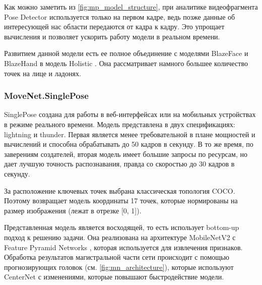 Как можно заметить из \autoref{fig:mp_model_structure}, при аналитике видеофрагмента Pose Detector используется только на первом кадре, ведь позже данные об интересующей нас области передаются от кадра к кадру. Это упрощает вычисления и позволяет ускорить работу модели в реальном времени.

Развитием данной модели есть ее полное объединение с моделями BlazeFace и BlazeHand в модель Holistic \cite{Holistic}. Она рассматривает намного большее количество точек на лице и ладонях.



\subsubsection{MoveNet.SinglePose}

SinglePose создана для работы в веб-интерфейсах или на мобильных устройствах в режиме реального времени. Модель представлена в двух спецификациях: lightning и thunder. Первая является менее требовательной в плане мощностей и вычислений и способна обрабатывать до 50 кадров в секунду. В то же время, по заверениям создателей, вторая модель имеет большие запросы по ресурсам, но дает лучшую точность распознавания, правда со скоростью до 30 кадров в секунду.

За расположение ключевых точек выбрана классическая топология COCO. Поэтому возвращает модель координаты 17 точек, которые нормированы на размер изображения (лежат в отрезке [0, 1]).

Представленная модель является восходящей, то есть использует bottom-up подход к решению задачи. Она реализована на архитектуре MobileNetV2 \cite{mobilenetv2} с Feature Pyramid Networks \cite{feature_piramid}, которая используется для извлечения признаков. Обработка результатов магистральной части сети происходит с помощью прогнозирующих головок (см. \autoref{fig:mn_architecture}), которые используют CenterNet \cite{CenterNet} с изменениями, которые повышают быстродействие модели.

